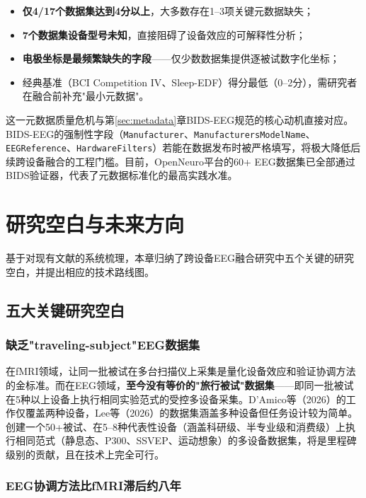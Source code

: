 \documentclass[12pt, a4paper]{article}
\begin{document}
\begin{itemize}
  \item \textbf{仅4/17个数据集达到4分以上}，大多数存在1--3项关键元数据缺失；
  \item \textbf{7个数据集设备型号未知}，直接阻碍了设备效应的可解释性分析；
  \item \textbf{电极坐标是最频繁缺失的字段}——仅少数数据集提供逐被试数字化坐标；
  \item 经典基准（BCI Competition IV\citep{Tangermann2012BCIcomp}、Sleep-EDF）得分最低（0--2分），需研究者在融合前补充"最小元数据"。
\end{itemize}

这一元数据质量危机与第\ref{sec:metadata}章BIDS-EEG规范的核心动机直接对应。BIDS-EEG的强制性字段（\texttt{Manufacturer}、\texttt{ManufacturersModelName}、\texttt{EEGReference}、\texttt{HardwareFilters}）若能在数据发布时被严格填写，将极大降低后续跨设备融合的工程门槛。目前，OpenNeuro平台的60+ EEG数据集已全部通过BIDS验证器，代表了元数据标准化的最高实践水准。

\section{研究空白与未来方向}
\label{sec:gaps}

基于对现有文献的系统梳理，本章归纳了跨设备EEG融合研究中五个关键的研究空白，并提出相应的技术路线图。

\subsection{五大关键研究空白}

\subsubsection{缺乏"traveling-subject"EEG数据集}

在fMRI领域，让同一批被试在多台扫描仪上采集是量化设备效应和验证协调方法的金标准。而在EEG领域，\textbf{至今没有等价的"旅行被试"数据集}——即同一批被试在5种以上设备上执行相同实验范式的受控多设备采集。D'Amico等（2026）的工作仅覆盖两种设备\citep{DAmico2026}，Lee等（2026）的数据集涵盖多种设备但任务设计较为简单\citep{Lee2026dataset}。创建一个50+被试、在5--8种代表性设备（涵盖科研级、半专业级和消费级）上执行相同范式（静息态、P300、SSVEP、运动想象）的多设备数据集，将是里程碑级别的贡献，且在技术上完全可行。

\subsubsection{EEG协调方法比fMRI滞后约八年}
\end{document}

